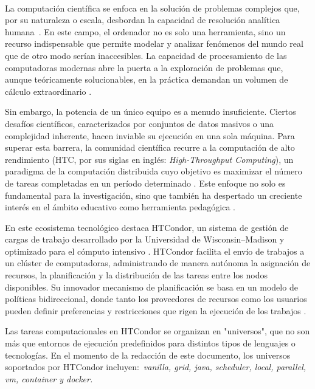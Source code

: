 \label{cap:introduccion}
\mbox{}\\

La computación científica se enfoca en la solución de problemas complejos que, por su naturaleza o escala, desbordan la capacidad de resolución analítica humana~\citep{landau01}. En este campo, el ordenador no es solo una herramienta, sino un recurso indispensable que permite modelar y analizar fenómenos del mundo real que de otro modo serían inaccesibles. La capacidad de procesamiento de las computadoras modernas abre la puerta a la exploración de problemas que, aunque teóricamente solucionables, en la práctica demandan un volumen de cálculo extraordinario \citep{landau01}.

Sin embargo, la potencia de un único equipo es a menudo insuficiente. Ciertos desafíos científicos, caracterizados por conjuntos de datos masivos o una complejidad inherente, hacen inviable su ejecución en una sola máquina. Para superar esta barrera, la comunidad científica recurre a la computación de alto rendimiento (HTC, por sus siglas en inglés: \textit{High-Throughput Computing}), un paradigma de la computación distribuida cuyo objetivo es maximizar el número de tareas completadas en un período determinado \citep{juve-01}. Este enfoque no solo es fundamental para la investigación, sino que también ha despertado un creciente interés en el ámbito educativo como herramienta pedagógica \citep{Senol-01}.

En este ecosistema tecnológico destaca HTCondor, un sistema de gestión de cargas de trabajo desarrollado por la Universidad de Wisconsin–Madison y optimizado para el cómputo intensivo \citep{chang-01, htcondor-description}. HTCondor facilita el envío de trabajos a un clúster de computadoras, administrando de manera autónoma la asignación de recursos, la planificación y la distribución de las tareas entre los nodos disponibles. Su innovador mecanismo de planificación se basa en un modelo de políticas bidireccional, donde tanto los proveedores de recursos como los usuarios pueden definir preferencias y restricciones que rigen la ejecución de los trabajos \citep{htcondor-description}.

Las tareas computacionales en HTCondor se organizan en "universos", que no son más que entornos de ejecución predefinidos para distintos tipos de lenguajes o tecnologías. En el momento de la redacción de este documento, los universos soportados por HTCondor incluyen:~\textit{vanilla, grid, java, scheduler, local, parallel, vm, container y docker.}

